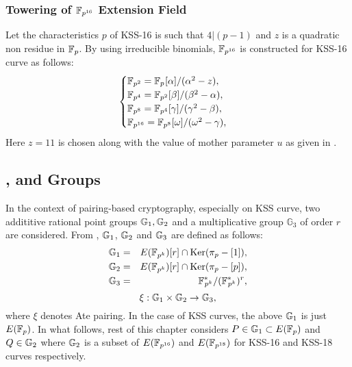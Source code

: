 \subsubsection{Towering of \texorpdfstring{$\mathbb{F}_{p^{16}}$}{} Extension Field}
Let the characteristics $p$ of KSS-16 is such that  $4|(p-1)$  and $z$ is a quadratic non residue in ${\mathbb{F}}_{p}$. By using irreducible binomials, $\mathbb{F}_{p^{16}}$ is constructed for KSS-16 curve  as follows:
\begin{equation}\label{eq_KSS16_towering_towering_chap_ijnc2017}
\begin{cases}
{\mathbb{F}}_{p^{2}} = {\mathbb{F}}_{p^{}}[\alpha]/(\alpha^2-z),  \\ 
{\mathbb{F}}_{p^{4}} = {\mathbb{F}}_{p^{2}}[\beta]/(\beta^2-\alpha),  \\ 
{\mathbb{F}}_{p^{8}} = {\mathbb{F}}_{p^{4}}[\gamma]/(\gamma^2-\beta), \\ 
{\mathbb{F}}_{p^{16}} = {\mathbb{F}}_{p^{8}}[\omega]/(\omega^2-\gamma), \\ 
\end{cases}
\end{equation}
Here $z = 11$ is chosen along with the value of mother parameter $u$ as given in .

\subsection{\texorpdfstring{}{G1}, \texorpdfstring{}{G2} and \texorpdfstring{}{G3} Groups} In the context of pairing-based cryptography, especially on KSS curve, two addititive rational point groups ${\mathbb{G}}_{1}, {\mathbb{G}}_{2}$ and a multiplicative group $\mathbb{G}_3$ of order $r$ are considered. From \cite{PAIRING:MANS13},  ${\mathbb{G}}_{1}$, ${\mathbb{G}}_{2}$ and ${\mathbb{G}}_{3}$ are defined as follows:
\begin{eqnarray}\label{eq:groupsg1g2g3_chap_ijnc2017}
{\mathbb{G}}_{1} & = &  E({\mathbb{F}}_{p^{k}}) [r] \cap \text{Ker}(\pi_p - [1]), \nonumber \\
{\mathbb{G}}_{2} & = &  E({\mathbb{F}}_{p^{k}}) [r] \cap \text{Ker}(\pi_p - [p]), \nonumber \\
{\mathbb{G}}_{3} & = & {{\mathbb{F}}^{\ast}}_{\!\!\!p^{k}}/({{\mathbb{F}}^{\ast}}_{\!\!\!p^{k}})^r, \nonumber
\end{eqnarray}
\begin{equation}
\xi : {\mathbb{G}}_{1} \times {\mathbb{G}}_{2} \rightarrow {\mathbb{G}}_{3},
\end{equation}
where $\xi$ denotes Ate pairing. In the case of KSS curves, the above ${\mathbb{G}}_{1}$ is just $E(\mathbb{F}_p)$. In what follows, rest of this chapter considers 
 $P \in {\mathbb{G}}_{1} \subset E(\mathbb{F}_p)$ and  $Q \in {\mathbb{G}}_{2}$ where  ${\mathbb{G}}_{2}$ is a subset of $E(\mathbb{F}_{p^{16}})$ and $E(\mathbb{F}_{p^{18}})$ for KSS-16 and KSS-18 curves respectively. 

